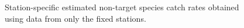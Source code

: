 \documentclass[12pt]{article}\usepackage[]{graphicx}\usepackage[]{color}
\begin{document}
\begin{appendices}
\begin{figure}[htb]
{\centering {} 

}

\caption{Station-specific estimated non-target species catch rates obtained using data from only the fixed stations.}\label{fig:non-target-spat-fixed}
\end{figure}
\begin{figure}[htb]


\end{figure}
\end{appendices}
\end{document}
